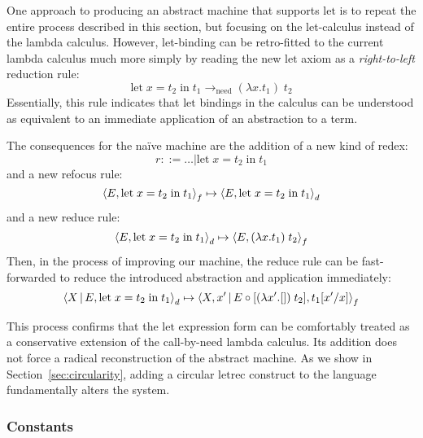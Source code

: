 \documentclass{LMCS}
\theoremstyle{plain}
\theoremstyle{remark}
\renewcommand{\comp}[0]{\ensuremath{\circ}}
\newcommand{\refocus}[1]{\Braket{#1}_f}
\newcommand{\reduce}[1]{\Braket{#1}_d}
\newcommand{\notion}[0]{\ensuremath{\rightarrow_{\mathrm{need}}}}
\begin{document}
One approach to producing an abstract machine that supports $\mathrm{let}$ is
to repeat the entire process described in this section, but focusing on the
let-calculus instead of the lambda calculus.  However, let-binding can
be retro-fitted to the current lambda calculus much more simply by reading the
new $\mathrm{let}$ axiom as a \emph{right-to-left} reduction rule:
\begin{displaymath}
     \mathrm{let}\; x=t_2\; \mathrm{in}\; t_1  \notion{} (\lambda x.t_1)\;t_2 
\end{displaymath}
Essentially, this rule indicates that $\mathrm{let}$ bindings in the calculus
can be understood as equivalent to an immediate application of an abstraction
to a term.  

The consequences for the na\"ive machine are the addition of a new kind of
redex:
\begin{displaymath}
 r ::= \dots | \mathrm{let}\; x=t_2\; \mathrm{in}\; t_1 
\end{displaymath}
and a new refocus rule:
\begin{displaymath}
  \refocus{E,\mathrm{let}\; x=t_2\; \mathrm{in}\; t_1}
  \mapsto
  \reduce{E,\mathrm{let}\; x=t_2\; \mathrm{in}\; t_1}
\end{displaymath}
and a new reduce rule:
\begin{displaymath}
  \reduce{E,\mathrm{let}\; x=t_2\; \mathrm{in}\; t_1}
  \mapsto
  \refocus{E,(\lambda x.t_1)\;t_2}
\end{displaymath}
Then, in the process of improving our machine, the reduce rule can be
fast-forwarded to reduce the introduced abstraction and application
immediately:
\begin{displaymath}
  \reduce{X|E,\mathrm{let}\; x=t_2\; \mathrm{in}\; t_1}
  \mapsto
  \refocus{X,x'|E\comp[(\lambda x'.[])\;t_2],t_1[x'/x]}
\end{displaymath}

This process confirms that the $\mathrm{let}$ expression form can be
comfortably treated as a conservative extension of the call-by-need lambda
calculus.  Its addition does not force a radical reconstruction of the abstract
machine.  As we show in Section~\ref{sec:circularity}, adding a circular
$\mathrm{letrec}$ construct to the language fundamentally alters the system.


\subsubsection{Constants}
\end{document}
